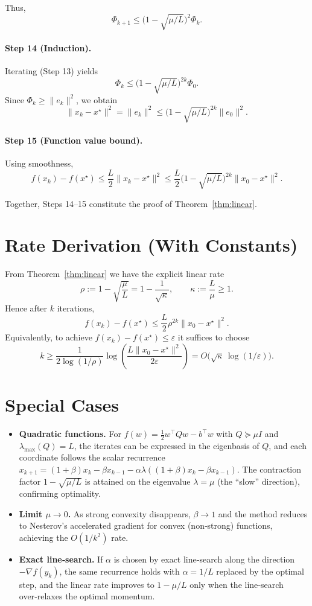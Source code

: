 \documentclass{article}
\begin{document}
Thus,
\[
\Phi_{k+1}\le \bigl(1-\sqrt{\mu/L}\bigr)^2 \Phi_k . \tag{Step 13}
\]

\paragraph{Step 14 (Induction).}
Iterating (Step 13) yields
\[
\Phi_k \le \bigl(1-\sqrt{\mu/L}\bigr)^{2k}\Phi_0 .
\]
Since $\Phi_k\ge \|e_k\|^2$, we obtain
\[
\|x_k-x^\star\|^2 = \|e_k\|^2 \le
\bigl(1-\sqrt{\mu/L}\bigr)^{2k}\|e_0\|^2 .
\tag{Step 14}
\]

\paragraph{Step 15 (Function value bound).}
Using smoothness,
\[
f(x_k)-f(x^\star) \le \frac{L}{2}\|x_k-x^\star\|^2
                 \le \frac{L}{2}\bigl(1-\sqrt{\mu/L}\bigr)^{2k}\|x_0-x^\star\|^2 .
\tag{Step 15}
\]

Together, Steps 14–15 constitute the proof of Theorem~\ref{thm:linear}.

\section*{Rate Derivation (With Constants)}
From Theorem~\ref{thm:linear} we have the explicit linear rate
\[
\rho := 1-\sqrt{\frac{\mu}{L}} = 1-\frac{1}{\sqrt{\kappa}},\qquad
\kappa:=\frac{L}{\mu}\ge 1.
\]
Hence after $k$ iterations,
\[
f(x_k)-f(x^\star) \le
\frac{L}{2}\rho^{2k}\|x_0-x^\star\|^2 .
\]
Equivalently, to achieve $f(x_k)-f(x^\star)\le\varepsilon$ it suffices to
choose
\[
k\ge \frac{1}{2\log(1/\rho)}\log\!\left(\frac{L\|x_0-x^\star\|^2}{2\varepsilon}\right)
   = O\!\bigl(\sqrt{\kappa}\,\log(1/\varepsilon)\bigr).
\]

\section*{Special Cases}
\begin{itemize}
\item \textbf{Quadratic functions.} For $f(w)=\frac12 w^\top Q w - b^\top w$ with
$Q\succeq \mu I$ and $\lambda_{\max}(Q)=L$, the iterates can be expressed in the
eigenbasis of $Q$, and each coordinate follows the scalar recurrence
$x_{k+1}= (1+\beta)x_k-\beta x_{k-1} - \alpha\lambda ( (1+\beta)x_k-\beta x_{k-1})$.
The contraction factor $1-\sqrt{\mu/L}$ is attained on the eigenvalue
$\lambda=\mu$ (the “slow” direction), confirming optimality.
\item \textbf{Limit $\mu\to 0$.} As strong convexity disappears,
$\beta\to 1$ and the method reduces to Nesterov’s accelerated gradient for
convex (non‑strong) functions, achieving the $O(1/k^2)$ rate.
\item \textbf{Exact line‑search.} If $\alpha$ is chosen by exact line‑search
along the direction $-\nabla f(y_k)$, the same recurrence holds with
$\alpha=1/L$ replaced by the optimal step, and the linear rate improves
to $1-\mu/L$ only when the line‑search over‑relaxes the optimal momentum.
\end{itemize}
\end{document}
